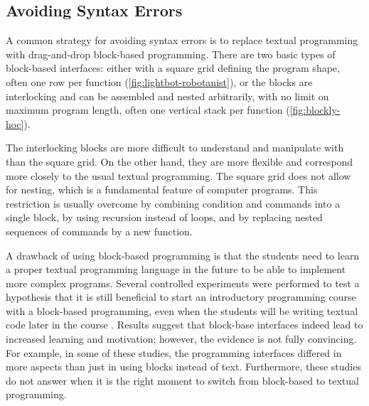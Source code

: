 \subsection{Avoiding Syntax Errors}
\label{sec:avoiding-syntax-errors}

A common strategy for avoiding syntax errors is to replace textual programming
with drag-and-drop block-based programming.
There are two basic types of block-based interfaces:
  either with a square grid defining the program shape,
  often one row per function
  (\cref{fig:lightbot-robotanist}),
  or the blocks are interlocking and can be assembled and nested arbitrarily,
  with no limit on maximum program length,
  often one vertical stack per function
  (\cref{fig:blockly-hoc}).

The interlocking blocks are more difficult to understand and manipulate with
  than the square grid.
On the other hand, they are more flexible
  and correspond more closely to the usual textual programming.
The square grid does not allow for nesting,
  which is a fundamental feature of computer programs.
This restriction is usually overcome by
  combining condition and commands into a single block,
  by using recursion instead of loops,
  and by replacing nested sequences of commands by a new function.


A drawback of using block-based programming
  is that the students need to learn a proper textual programming language in
  the future to be able to implement more complex programs.
Several controlled experiments were performed to test a hypothesis
  that it is still beneficial to start an introductory programming course
  with a block-based programming,
  even when the students will be writing textual code later in the course
  \cite{comparing-blocks-text-price2015, comparing-blocks-text-weintrop2017}.
Results suggest that block-base interfaces indeed lead to increased learning and
motivation; however, the evidence is not fully convincing. For example, in
some of these studies, the programming interfaces differed in more aspects than
just in using blocks instead of text. Furthermore, these studies do not
answer when it is the right moment to switch from block-based to textual
programming.

